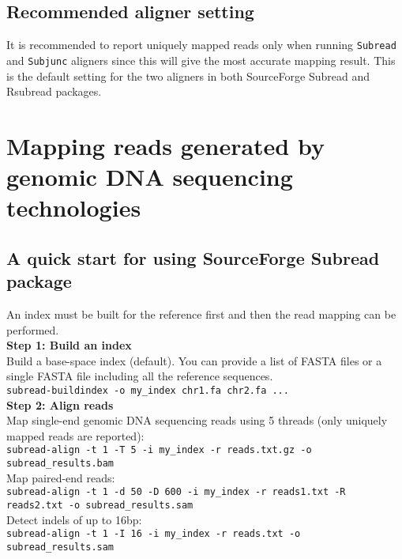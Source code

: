 \documentclass[12pt]{report}
\newcommand{\code}[1]{{\small\texttt{#1}}}
\newcommand{\Subread}{\textsf{Subread}}
\newcommand{\Rsubread}{\textsf{Rsubread}}
\begin{document}
\section{Recommended aligner setting}

It is recommended to report uniquely mapped reads only when running \code{Subread} and \code{Subjunc} aligners since this will give the most accurate mapping result.
This is the default setting for the two aligners in both SourceForge {\Subread} and {\Rsubread} packages.

\chapter{Mapping reads generated by genomic DNA sequencing technologies}
\label{chapter:subread-dnaseq}

\section{A quick start for using SourceForge {\Subread} package}

An index must be built for the reference first and then the read mapping can be performed.\\

{\noindent\bf Step 1: Build an index}\\

\noindent Build a base-space index (default). You can provide a list of FASTA files or a single FASTA file including all the reference sequences.\\

\code{subread-buildindex -o my\_index chr1.fa chr2.fa ...}\\

{\noindent\bf Step 2: Align reads}\\

\noindent Map single-end genomic DNA sequencing reads using 5 threads (only uniquely mapped reads are reported):\\
\code{subread-align -t 1 -T 5 -i my\_index -r reads.txt.gz -o subread\_results.bam}\\

\noindent Map paired-end reads:\\
\code{subread-align -t 1 -d 50 -D 600 -i my\_index -r reads1.txt -R reads2.txt \newline -o subread\_results.sam}\\

\noindent Detect indels of up to 16bp:\\
\code{subread-align -t 1 -I 16 -i my\_index -r reads.txt -o subread\_results.sam}\\
\end{document}

